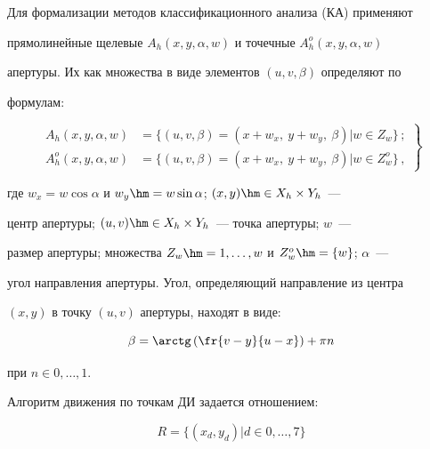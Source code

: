   


  Для формализации методов классификационного анализа (КА) применяют 


прямолинейные щелевые $A_h(x,y,\alpha,w)$ и точечные $A_h^o(x,y,\alpha,w)$ 


апертуры. Их как множества в виде элементов $(u,v,\beta)$ определяют по 


формулам:





\noindent


  \begin{equation}


  \left.


  \begin{array}{rl}


  A_h(x,y,\alpha,w) &= \{(u,v,\beta)=(x+w_x,\ y+w_y,\ \beta)\vert w\in 


Z_w\}\,;\\[9pt]


  A_h^o(x,y,\alpha,w) &= \{(u,v,\beta)=(x+w_x,\ y+w_y,\ \beta)\vert w\in 


Z^o_w\}\,,


  \end{array}


  \right\}


  \label{e3-gk}


  \end{equation}


где $w_x=w\cos\alpha$ и $w_y\hm=w\sin\alpha$; $(x,y)\hm\in X_h\times Y_h$~---


центр апертуры; $(u,v)\hm\in X_h\times Y_h$~--- точка апертуры; $w$~--- 


размер апертуры; множества $Z_w\hm=1, \ldots ,w$ и $Z_w^o\hm=\{w\}$; $\alpha$~--- 


угол направления апертуры. Угол, определяющий направление из центра 


$(x,y)$ в точку $(u,v)$ апертуры, находят в виде:


$$


\beta = \arctg \left( \fr{v-y}{u-x}\right) +\pi n$$


при $n\in 0, \ldots ,1$.


  


  Алгоритм движения по точкам ДИ задается отношением:


  \begin{equation}


  R=\{(x_d,y_d)\vert d\in 0, \ldots ,7\}


  \label{e4-gk}


  \end{equation}


